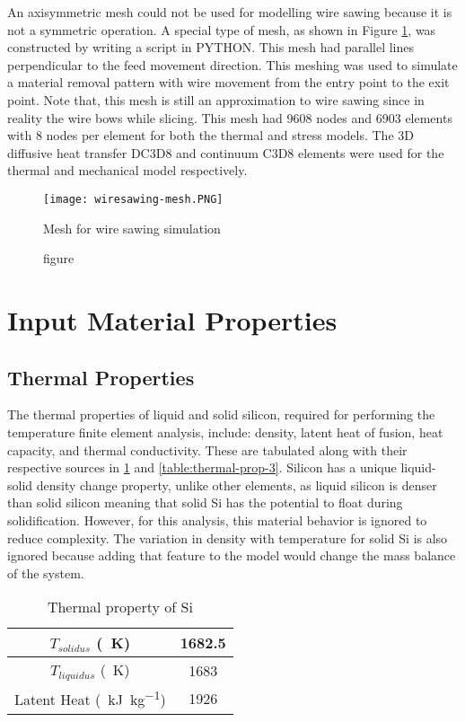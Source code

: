 An axisymmetric mesh could not be used for modelling wire sawing because it is not a symmetric operation. A special type of mesh, as shown in Figure \ref{fig:wiresawing-mesh}, was constructed by writing a script in PYTHON. This mesh had parallel lines perpendicular to the feed movement direction. This meshing was used to simulate a material removal pattern with wire movement from the entry point to the exit point. Note that, this mesh is still an approximation to wire sawing since in reality the wire bows while slicing. This mesh had 9608 nodes and 6903 elements with 8 nodes per element for both the thermal and stress models. The 3D diffusive heat transfer DC3D8 and continuum C3D8 elements were used for the thermal and mechanical model respectively.

\begin{figure}
    \centering
    \texttt{[image: wiresawing-mesh.PNG]}
    \caption{figure}{Mesh for wire sawing simulation}
    \label{fig:wiresawing-mesh}
\end{figure}

\section{Input Material Properties}

\subsection{Thermal Properties}
The thermal properties of liquid and solid silicon, required for performing the temperature finite element analysis, include: density, latent heat of fusion, heat capacity, and thermal conductivity. These are tabulated along with their respective sources in \ref{table:thermal-prop-1} and \ref{table:thermal-prop-3}. Silicon has a unique liquid-solid density change property, unlike other elements, as liquid silicon is denser than solid silicon meaning that solid Si has the potential to float during solidification. However, for this analysis, this material behavior is ignored to reduce complexity. The variation in density with temperature for solid Si is also ignored because adding that feature to the model would change the mass balance of the system.

\begin{table}[h]
    \centering
    \begin{tabular}{|c|c|}
    \hline
    $T_{solidus}$ (\SI{}{K}) & 1682.5 \\ 
    \hline
    $T_{liquidus}$ (\SI{}{K}) & 1683 \\
    \hline
    Latent Heat (\SI{}{kJ.kg^{-1}}) & 1926 \\
    \hline
    \end{tabular}
    \caption{Thermal property of Si \cite{}}
    \label{table:thermal-prop-1}
\end{table}

